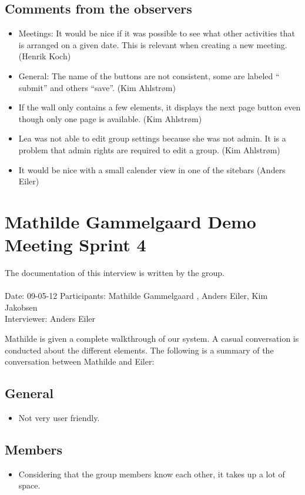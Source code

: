 \subsection*{Comments from the observers}
\begin{itemize}
	\item Meetings: It would be nice if it was possible to see what other activities that is arranged on a given date. This is relevant when creating a new meeting.(Henrik Koch)
	\item General: The name of the buttons are not consistent, some are labeled `` submit'' and others ``save''. (Kim Ahlstrøm)
	\item If the wall only contains a few elements, it displays the next page button even though only one page is available. (Kim Ahlstrøm)
	\item Lea was not able to edit group settings because she was not admin. It is a problem that admin rights are required to edit a group. (Kim Ahlstrøm)
	\item It would be nice with a small calender view in one of the sitebars (Anders Eiler)
\end{itemize}


\section{Mathilde Gammelgaard Demo Meeting Sprint 4}
\label{app:mathildedemo}
The documentation of this interview is written by the \timelinegroup{} group. \\ \ \\
Date: 09-05-12
Participants: Mathilde Gammelgaard , Anders Eiler, Kim Jakobsen \\
Interviewer: Anders Eiler

Mathilde is given a complete walkthrough of our system.
A casual conversation is conducted about the different elements.
The following is a summary of the conversation between Mathilde and Eiler:

\subsection*{General}
\begin{itemize}
	\item Not very user friendly.
\end{itemize}


\subsection*{Members}
\begin{itemize}
	\item Considering that the group members know each other, it takes up a lot of space.
\end{itemize}


